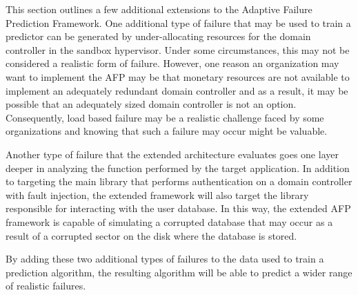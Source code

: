 This section outlines a few additional extensions to the Adaptive Failure
Prediction Framework.  One additional type of failure that may be used to train
a predictor can be generated by under-allocating resources for the domain
controller in the sandbox hypervisor.  Under some circumstances, this may not
be considered a realistic form of failure.  However, one reason an organization
may want to implement the AFP may be that monetary resources are not available
to implement an adequately redundant domain controller and as a result, it may
be possible that an adequately sized domain controller is not an option.
Consequently, load based failure may be a realistic challenge faced by some
organizations and knowing that such a failure may occur might be valuable.

Another type of failure that the extended architecture evaluates goes one layer
deeper in analyzing the function performed by the target application.  In
addition to targeting the main library that performs authentication on a domain
controller with fault injection, the extended framework will also target the
library responsible for interacting with the user database.  In this way, the
extended AFP framework is capable of simulating a corrupted database that may
occur as a result of a corrupted sector on the disk where the database is
stored.

By adding these two additional types of failures to the data used to train a
prediction algorithm, the resulting algorithm will be able to predict a wider
range of realistic failures.

